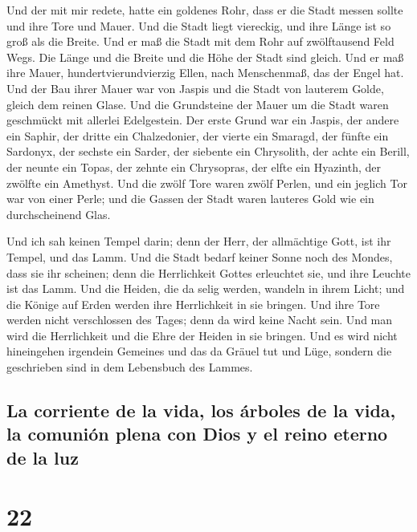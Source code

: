  Und der mit mir redete, hatte ein goldenes Rohr, dass er
die Stadt messen sollte und ihre Tore und Mauer.  Und die
Stadt liegt viereckig, und ihre Länge ist so groß als die Breite. Und er
maß die Stadt mit dem Rohr auf zwölftausend Feld Wegs. Die Länge und die
Breite und die Höhe der Stadt sind gleich.  Und er maß
ihre Mauer, hundertvierundvierzig Ellen, nach Menschenmaß, das der Engel
hat.  Und der Bau ihrer Mauer war von Jaspis und die
Stadt von lauterem Golde, gleich dem reinen Glase.  Und
die Grundsteine der Mauer um die Stadt waren geschmückt mit allerlei
Edelgestein. Der erste Grund war ein Jaspis, der andere ein Saphir, der
dritte ein Chalzedonier, der vierte ein Smaragd,  der
fünfte ein Sardonyx, der sechste ein Sarder, der siebente ein
Chrysolith, der achte ein Berill, der neunte ein Topas, der zehnte ein
Chrysopras, der elfte ein Hyazinth, der zwölfte ein Amethyst.
 Und die zwölf Tore waren zwölf Perlen, und ein jeglich
Tor war von einer Perle; und die Gassen der Stadt waren lauteres Gold
wie ein durchscheinend Glas.

 Und ich sah keinen Tempel darin; denn der Herr, der
allmächtige Gott, ist ihr Tempel, und das Lamm.  Und die
Stadt bedarf keiner Sonne noch des Mondes, dass sie ihr scheinen; denn
die Herrlichkeit Gottes erleuchtet sie, und ihre Leuchte ist das Lamm.
 Und die Heiden, die da selig werden, wandeln in ihrem
Licht; und die Könige auf Erden werden ihre Herrlichkeit in sie bringen.
 Und ihre Tore werden nicht verschlossen des Tages; denn
da wird keine Nacht sein.  Und man wird die Herrlichkeit
und die Ehre der Heiden in sie bringen.  Und es wird
nicht hineingehen irgendein Gemeines und das da Gräuel tut und Lüge,
sondern die geschrieben sind in dem Lebensbuch des Lammes.

\hypertarget{la-corriente-de-la-vida-los-uxe1rboles-de-la-vida-la-comuniuxf3n-plena-con-dios-y-el-reino-eterno-de-la-luz}{%
\subsection{La corriente de la vida, los árboles de la vida, la comunión
plena con Dios y el reino eterno de la
luz}\label{la-corriente-de-la-vida-los-uxe1rboles-de-la-vida-la-comuniuxf3n-plena-con-dios-y-el-reino-eterno-de-la-luz}}

\hypertarget{section-21}{%
\section{22}\label{section-21}}

